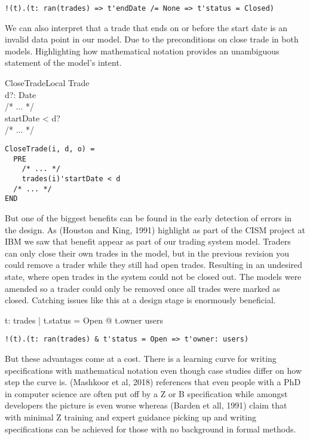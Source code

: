 \documentclass{article}
\begin{document}
\begin{verbatim}
!(t).(t: ran(trades) => t'endDate /= None => t'status = Closed)
\end{verbatim}
  
\hspace{-0.68cm} We can also interpret that a trade that ends on or before the start date is an invalid data point in our model. Due to the preconditions on close trade in both models. Highlighting how mathematical notation provides an unambiguous statement of the model's intent.

\begin{schema}{CloseTradeLocal}
\Delta Trade \\
d?: Date \\ 
/* ... */ \\
\where  
startDate < d? \\
/* ... */ \\
\end{schema}

\begin{verbatim}
CloseTrade(i, d, o) =
  PRE
    /* ... */
    trades(i)'startDate < d
  /* ... */
END 
\end{verbatim}

\hspace{-0.68cm} But one of the biggest benefits can be found in the early detection of errors in the design. As (Houston and King, 1991) highlight as part of the CISM project at IBM we saw that benefit appear as part of our trading system model. Traders can only close their own trades in the model, but in the previous revision you could remove a trader while they still had open trades. Resulting in an undesired state, where open trades in the system could not be closed out. The models were amended so a trader could only be removed once all trades were marked as closed. Catching issues like this at a design stage is enormously beneficial. 

\begin{zed}
\forall t: \ran trades | t.status = Open @ t.owner \in users \\ 
\end{zed}

\begin{verbatim}
!(t).(t: ran(trades) & t'status = Open => t'owner: users)
\end{verbatim}

\pagebreak

\hspace{-0.68cm} But these advantages come at a cost. There is a learning curve for writing specifications with mathematical notation even though case studies differ on how step the curve is. (Mashkoor et al, 2018) references that even people with a PhD in computer science are often put off by a Z or B specification while amongst developers the picture is even worse whereas (Barden et all, 1991) claim that with minimal Z training and expert guidance picking up and writing specifications can be achieved for those with no background in formal methods. \\
\end{document}
